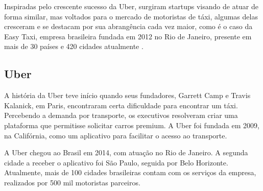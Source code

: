 Inspiradas pelo crescente sucesso da Uber, surgiram startups visando de atuar de forma similar, mas voltados para o mercado de motoristas de táxi, algumas delas cresceram e se destacam por sua abrangência cada vez maior, como é o caso da Easy Taxi, empresa brasileira fundada em 2012 no Rio de Janeiro, presente em mais de 30 países e 420 cidades atualmente \cite{caronae}.

\subsection{Uber}
A história da Uber teve início quando seus fundadores, Garrett Camp e Travis Kalanick, em Paris, encontraram certa dificuldade para encontrar um táxi. Percebendo a demanda por transporte, os executivos resolveram criar uma plataforma que permitisse solicitar carros premium. A Uber foi fundada em 2009, na Califórnia, como um aplicativo para facilitar o acesso ao transporte.

A Uber chegou ao Brasil em 2014, com atuação no Rio de Janeiro. A segunda cidade a receber o aplicativo foi São Paulo, seguida por Belo Horizonte. Atualmente, mais de 100 cidades brasileiras contam com os serviços da empresa, realizados por 500 mil motoristas parceiros. 

